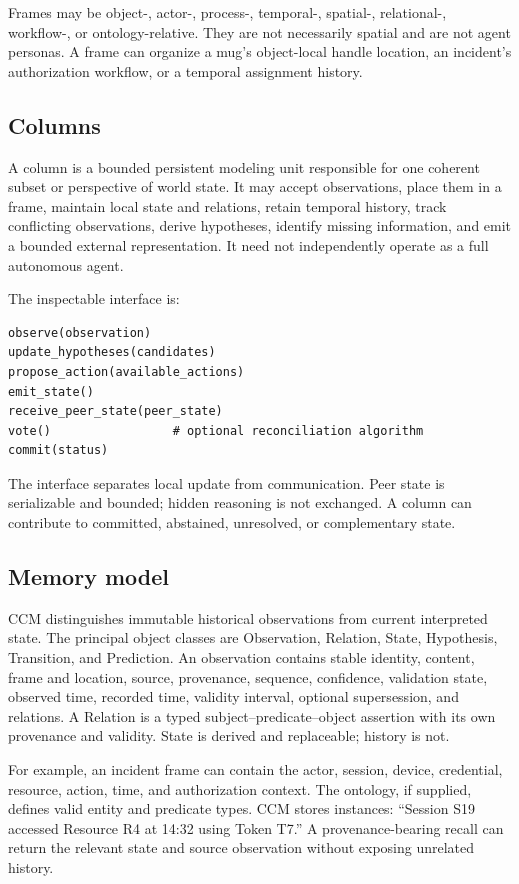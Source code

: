 Frames may be object-, actor-, process-, temporal-, spatial-, relational-, workflow-, or ontology-relative. They are not necessarily spatial and are not agent personas. A frame can organize a mug's object-local handle location, an incident's authorization workflow, or a temporal assignment history.

\subsection{Columns}

A column is a bounded persistent modeling unit responsible for one coherent subset or perspective of world state. It may accept observations, place them in a frame, maintain local state and relations, retain temporal history, track conflicting observations, derive hypotheses, identify missing information, and emit a bounded external representation. It need not independently operate as a full autonomous agent.

The inspectable interface is:

\begin{verbatim}
observe(observation)
update_hypotheses(candidates)
propose_action(available_actions)
emit_state()
receive_peer_state(peer_state)
vote()                 # optional reconciliation algorithm
commit(status)
\end{verbatim}

The interface separates local update from communication. Peer state is serializable and bounded; hidden reasoning is not exchanged. A column can contribute to committed, abstained, unresolved, or complementary state.

\subsection{Memory model}

CCM distinguishes immutable historical observations from current interpreted state. The principal object classes are Observation, Relation, State, Hypothesis, Transition, and Prediction. An observation contains stable identity, content, frame and location, source, provenance, sequence, confidence, validation state, observed time, recorded time, validity interval, optional supersession, and relations. A Relation is a typed subject--predicate--object assertion with its own provenance and validity. State is derived and replaceable; history is not.

For example, an incident frame can contain the actor, session, device, credential, resource, action, time, and authorization context. The ontology, if supplied, defines valid entity and predicate types. CCM stores instances: ``Session S19 accessed Resource R4 at 14:32 using Token T7.'' A provenance-bearing recall can return the relevant state and source observation without exposing unrelated history.

